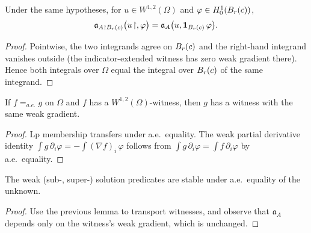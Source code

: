 \begin{lemma}
\label{lem:bilinForm_ball_restrict_eq_zeroExtend}
\leanok
{}
Under the same hypotheses, for $u \in W^{1,2}(\Omega)$ and $\varphi \in H^{1}_{0}(B_{r}(c))$,
\begin{equation*}
  \mathfrak{a}_{A\restriction B_{r}(c)}\bigl(u\!\restriction, \varphi\bigr)
  = \mathfrak{a}_{A}\bigl(u, \mathbf{1}_{B_{r}(c)}\,\varphi\bigr).
\end{equation*}
\end{lemma}

\begin{proof}
\leanok
{}

Pointwise, the two integrands agree on $B_{r}(c)$ and the right-hand integrand vanishes outside (the indicator-extended witness has zero weak gradient there). Hence both integrals over $\Omega$ equal the integral over $B_{r}(c)$ of the same integrand.
\end{proof}

\begin{lemma}
\label{lem:MemW1pWitness_of_ae_eq}
\leanok
{}
If $f =_{a.e.} g$ on $\Omega$ and $f$ has a $W^{1,2}(\Omega)$-witness, then $g$ has a witness with the same weak gradient.
\end{lemma}

\begin{proof}
\leanok

Lp membership transfers under a.e.\ equality. The weak partial derivative identity $\int g\,\partial_i\varphi = -\int (\nabla f)_i\,\varphi$ follows from $\int g\,\partial_i\varphi = \int f\,\partial_i\varphi$ by a.e.\ equality.
\end{proof}

\begin{theorem}
\label{thm:IsSubsolution_congr_ae}
\leanok
{}
The weak (sub-, super-) solution predicates are stable under a.e.\ equality of the unknown.
\end{theorem}

\begin{proof}
\leanok
{}

Use the previous lemma to transport witnesses, and observe that $\mathfrak{a}_A$ depends only on the witness's weak gradient, which is unchanged.
\end{proof}

